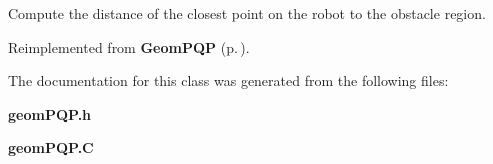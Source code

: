 Compute the distance of the closest point on the robot to the obstacle region.



Reimplemented from {\bf Geom\-PQP} {\rm (p.\,\pageref{GeomPQP_a5})}.

The documentation for this class was generated from the following files:\begin{CompactItemize}
\item 
{\bf geom\-PQP.h}\item 
{\bf geom\-PQP.C}\end{CompactItemize}
